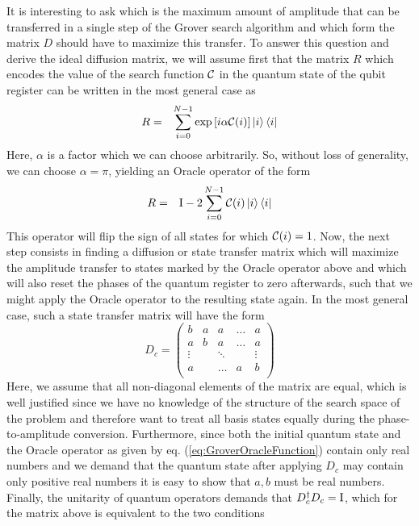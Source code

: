 It is interesting to ask which is the maximum amount of amplitude that can be transferred in a single step of the Grover search algorithm and which form the matrix $D$ should have to maximize this transfer. To answer this question and derive the ideal diffusion matrix, we will assume first that the matrix $R$ which encodes the value of the search function $\Or$ in the quantum state of the qubit register can be written in the most general case as
%
\begin{eqnarray}
R & = & \sum\limits_{i=0}^{N-1}\exp{\left[i\alpha\Or(i)\right]}\ket{i}\bra{i} \label{eq:GroverOracleFunctions}
\end{eqnarray}
%
Here, $\alpha$ is a factor which we can choose arbitrarily. So, without loss of generality, we can choose $\alpha = \pi$, yielding an Oracle operator of the form
%
\begin{eqnarray}
R & = & \begin{mathrm}I\end{mathrm}-2\sum\limits_{i=0}^{N-1} \Or(i)\ket{i}\bra{i} \label{eq:GroverOracleFunction}
\end{eqnarray}
%
This operator will flip the sign of all states for which $\Or(i) = 1$. Now, the next step consists in finding a diffusion or state transfer matrix which will maximize the amplitude transfer to states marked by the Oracle operator above and which will also reset the phases of the quantum register to zero afterwards, such that we might apply the Oracle operator to the resulting state again. In the most general case, such a state transfer matrix will have the form
%
\begin{equation}
D_c = \left(	
	\begin{array}{ccccc}
		b & a & a & \hdots & a \\
		a & b & a & \hdots & a \\
		\vdots & & \ddots &  &\vdots \\
		a & & \hdots & a & b \\
	\end{array}
\right)
\end{equation}
%
Here, we assume that all non-diagonal elements of the matrix are equal, which is well justified since we have no knowledge of the structure of the search space of the problem and therefore want to treat all basis states equally during the phase-to-amplitude conversion. Furthermore, since both the initial quantum state and the Oracle operator as given by eq. (\ref{eq:GroverOracleFunction}) contain only real numbers and we demand that the quantum state after applying $D_c$ may contain only positive real numbers it is easy to show that $a,b$ must be real numbers. Finally, the unitarity of quantum operators demands that $D_c^\dagger D_c = \begin{mathrm}I\end{mathrm}$, which for the matrix above is equivalent to the two conditions
